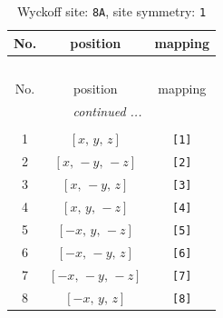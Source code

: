 \documentclass[fleqn,8pt]{jsarticle}
\begin{document}
\renewcommand{\arraystretch}{1.2}
\begin{longtable}{ccc}
\caption{Wyckoff site: {\tt 8A}, site symmetry: {\tt 1}}
 \\
 \hline \hline
No. & position & mapping \\ \hline \endfirsthead

\multicolumn{2}{l}{\tablename\ \thetable{}} \\
 \hline \hline
No. & position & mapping \\ \hline \endhead

 \hline \hline
\multicolumn{2}{r}{\footnotesize\it continued ...} \\ \endfoot

 \hline \hline
\multicolumn{2}{r}{} \\ \endlastfoot

1 & $\left[ x,\, y,\, z \right]$ & {\tt [1]} \\ \hline
2 & $\left[ x,\, - y,\, - z \right]$ & {\tt [2]} \\ \hline
3 & $\left[ x,\, - y,\, z \right]$ & {\tt [3]} \\ \hline
4 & $\left[ x,\, y,\, - z \right]$ & {\tt [4]} \\ \hline
5 & $\left[ - x,\, y,\, - z \right]$ & {\tt [5]} \\ \hline
6 & $\left[ - x,\, - y,\, z \right]$ & {\tt [6]} \\ \hline
7 & $\left[ - x,\, - y,\, - z \right]$ & {\tt [7]} \\ \hline
8 & $\left[ - x,\, y,\, z \right]$ & {\tt [8]} \\
\end{longtable}
\end{document}

